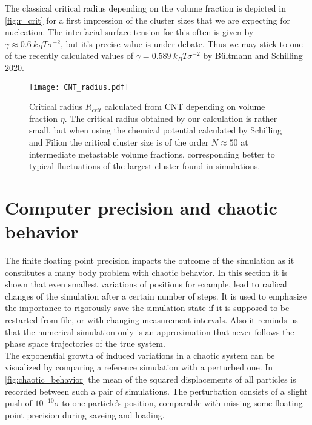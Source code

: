 The classical critical radius depending on the volume fraction is depicted in \autoref{fig:r_crit} for a first impression of the cluster sizes that we are expecting for nucleation. The interfacial surface tension for this often is given by $\gamma \approx \SI{0.6}{k_B T \sigma^{-2}}$, but it's precise value is under debate. Thus we may stick to one of the recently calculated values of $\gamma = \SI{0.589}{k_B T \sigma^{-2}}$ by Bültmann and Schilling 2020\cite{Bultmann2020}. 
\begin{figure}[h]
\centering
\texttt{[image: CNT\_radius.pdf]}
\caption[Critical radius in the metastable regime]{Critical radius $R_{crit}$ calculated from CNT depending on volume fraction $\eta$. The critical radius obtained by our calculation is rather small, but when using the chemical potential calculated by Schilling and Filion the critical cluster size is of the order $N \approx 50$ at intermediate metastable volume fractions, corresponding better to typical fluctuations of the largest cluster found in simulations.}
\label{fig:r_crit}
\end{figure}

\section{Computer precision and chaotic behavior}
\label{sec:precision}
The finite floating point precision impacts the outcome of the simulation as it constitutes a many body problem with chaotic behavior. In this section it is shown that even smallest variations of positions for example, lead to radical changes of the simulation after a certain number of steps. It is used to emphasize the importance to rigorously save the simulation state if it is supposed to be restarted from file, or with changing measurement intervals. Also it reminds us that the numerical simulation only is an approximation that never follows the phase space trajectories of the true system.\\

The exponential growth of induced variations in a chaotic system can be visualized by comparing a reference simulation with a perturbed one. In \autoref{fig:chaotic_behavior} the mean of the squared displacements of all particles is recorded between such a pair of simulations. The perturbation consists of a slight push of $10^{-10} \sigma$ to one particle's position, comparable with missing some floating point precision during saveing and loading.\\

